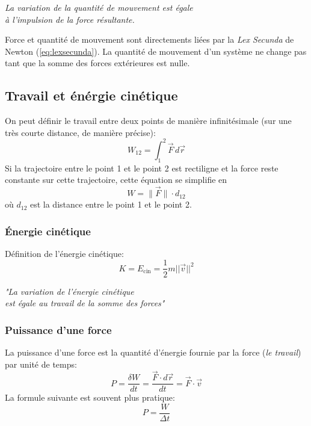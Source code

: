 \documentclass{article}
\numberwithin{equation}{section}
\providecommand{\norm}[1]{{\lVert#1\rVert}}
\begin{document}
\begin{center}
	\emph{La variation de la quantité de mouvement est égale \\ à l'impulsion de la force résultante.}
\end{center}

Force et quantité de mouvement sont directements liées par la \emph{Lex Secunda} de Newton (\ref{eq:lexsecunda}). La quantité de mouvement d'un système ne change pas tant que la somme des forces extérieures est nulle.

\subsection{Travail et énérgie cinétique}

On peut définir le travail entre deux points de manière infinitésimale (sur une très courte distance, de manière précise):
\begin{equation}
	\boxed{ W_{12} = \int_1^2 \vec F \, d \vec r }
\end{equation}
Si la trajectoire entre le point 1 et le point 2 est rectiligne et la force reste constante sur cette trajectoire, cette équation se simplifie en
\begin{equation}
	\boxed{W = \norm{\vec F} \cdot d_{12}}
\end{equation}
où $d_{12}$ est la distance entre le point 1 et le point 2.

\subsubsection{Énergie cinétique}
Définition de l'énergie cinétique:
\begin{equation}
	\boxed{ K = E_\text{cin} = \frac{1}{2} m ||\vec v||^2 }
\end{equation}

\begin{center}
	\emph{"La variation de l'énergie cinétique \\ est égale au travail de la somme des forces"}
\end{center}


\subsubsection{Puissance d'une force}
La puissance d'une force est la quantité d'énergie fournie par la force (\emph{le travail}) par unité de temps:
\begin{equation}
	\boxed{ P = \frac{\delta W}{dt} = \frac{\vec F \cdot d \vec r}{dt} = \vec F \cdot \vec v }
\end{equation}
La formule suivante est souvent plus pratique:
\begin{equation}
	\boxed{ P = \dfrac{W}{\Delta t} }
\end{equation}
\end{document}
